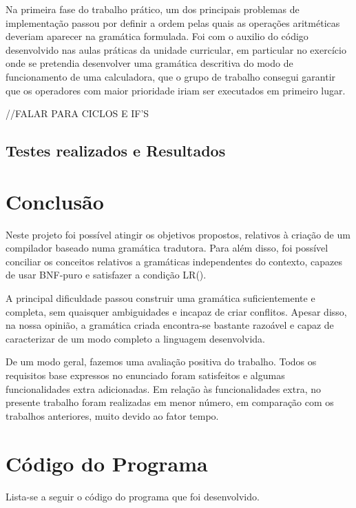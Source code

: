 \documentclass{report}
\begin{document}
Na primeira fase do trabalho prático, um dos principais problemas de implementação passou por definir a ordem pelas quais as operações aritméticas deveriam aparecer na gramática formulada. Foi com o auxilio do código desenvolvido nas aulas práticas da unidade curricular, em particular no exercício onde se pretendia desenvolver uma gramática descritiva do modo de funcionamento de uma calculadora, que o grupo de trabalho consegui garantir que os operadores com maior prioridade iriam ser executados em primeiro lugar.

//FALAR PARA CICLOS E IF'S

\section{Testes realizados e Resultados}




\chapter{Conclusão} \label{concl}

 
Neste projeto foi possível atingir os objetivos propostos, relativos à criação de um compilador baseado numa gramática tradutora. Para além disso, foi possível conciliar os conceitos relativos a gramáticas independentes do contexto, capazes de usar BNF-puro e satisfazer a condição LR(). 

A principal dificuldade passou construir uma gramática suficientemente e completa, sem quaisquer ambiguidades e incapaz de criar conflitos. Apesar disso, na nossa opinião, a gramática criada encontra-se bastante razoável e capaz de caracterizar de um modo completo a linguagem desenvolvida.

De um modo geral, fazemos uma avaliação positiva do trabalho. Todos os requisitos base expressos no enunciado foram satisfeitos e algumas funcionalidades extra adicionadas. Em relação às funcionalidades extra, no presente trabalho foram realizadas em menor número, em comparação com os trabalhos anteriores, muito devido ao fator tempo. 

\appendix
\chapter{Código do Programa}

Lista-se a seguir o código  do programa  que foi desenvolvido.




\end{document}
